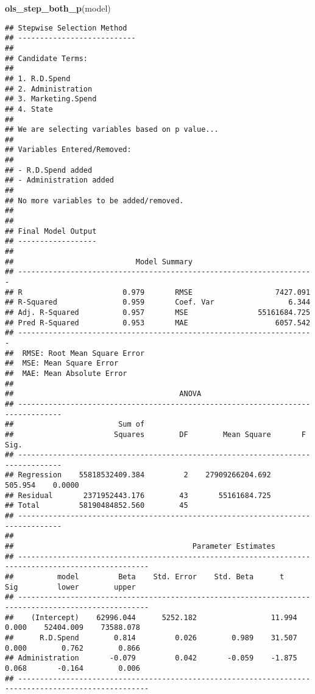 \documentclass[]{book}
\newenvironment{Shaded}{\begin{snugshade}}{\end{snugshade}}
\newcommand{\KeywordTok}[1]{\textcolor[rgb]{0.13,0.29,0.53}{\textbf{#1}}}
\newcommand{\NormalTok}[1]{#1}
\begin{document}
\begin{Shaded}
\begin{Highlighting}[]
\KeywordTok{ols_step_both_p}\NormalTok{(model)}
\end{Highlighting}
\end{Shaded}

\begin{verbatim}
## Stepwise Selection Method   
## ---------------------------
## 
## Candidate Terms: 
## 
## 1. R.D.Spend 
## 2. Administration 
## 3. Marketing.Spend 
## 4. State 
## 
## We are selecting variables based on p value...
## 
## Variables Entered/Removed: 
## 
## - R.D.Spend added 
## - Administration added 
## 
## No more variables to be added/removed.
## 
## 
## Final Model Output 
## ------------------
## 
##                            Model Summary                             
## --------------------------------------------------------------------
## R                       0.979       RMSE                   7427.091 
## R-Squared               0.959       Coef. Var                 6.344 
## Adj. R-Squared          0.957       MSE                55161684.725 
## Pred R-Squared          0.953       MAE                    6057.542 
## --------------------------------------------------------------------
##  RMSE: Root Mean Square Error 
##  MSE: Mean Square Error 
##  MAE: Mean Absolute Error 
## 
##                                      ANOVA                                       
## --------------------------------------------------------------------------------
##                        Sum of                                                   
##                       Squares        DF        Mean Square       F         Sig. 
## --------------------------------------------------------------------------------
## Regression    55818532409.384         2    27909266204.692    505.954    0.0000 
## Residual       2371952443.176        43       55161684.725                      
## Total         58190484852.560        45                                         
## --------------------------------------------------------------------------------
## 
##                                         Parameter Estimates                                          
## ----------------------------------------------------------------------------------------------------
##          model         Beta    Std. Error    Std. Beta      t        Sig         lower        upper 
## ----------------------------------------------------------------------------------------------------
##    (Intercept)    62996.044      5252.182                 11.994    0.000    52404.009    73588.078 
##      R.D.Spend        0.814         0.026        0.989    31.507    0.000        0.762        0.866 
## Administration       -0.079         0.042       -0.059    -1.875    0.068       -0.164        0.006 
## ----------------------------------------------------------------------------------------------------
\end{verbatim}
\end{document}

